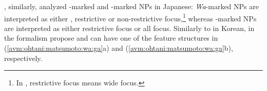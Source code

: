 \noindent \citet{ohtani:matsumoto:04}, similarly, analyzed \wa-marked
and \ga-marked NPs in Japanese: \textit{Wa}-marked NPs are interpreted
as either , restrictive  or non-restrictive
focus,\footnote{In \citet[95]{ohtani:matsumoto:04}, restrictive
  focus means wide focus.}  whereas \ga-marked NPs are interpreted as
either restrictive focus or all focus.  Similarly to
 in Korean, in the formalism
\citeauthor{ohtani:matsumoto:04} propose \wa and \ga can have one of
the feature structures in (\ref{avm:ohtani:matsumoto:wa:ga}a) and
(\ref{avm:ohtani:matsumoto:wa:ga}b), respectively.

